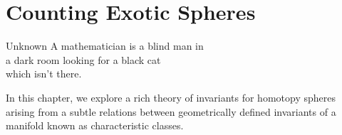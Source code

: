 \chapter{Counting Exotic Spheres}\label{chap:invariants}

\begin{epigraph}{15em}{Unknown}
	A mathematician is a blind man in \\
	a dark room looking for a black cat \\
	which isn’t there.
\end{epigraph}

In this chapter, we explore a rich theory of invariants for homotopy spheres arising from a subtle relations between geometrically defined invariants of a manifold known as characteristic classes. 



